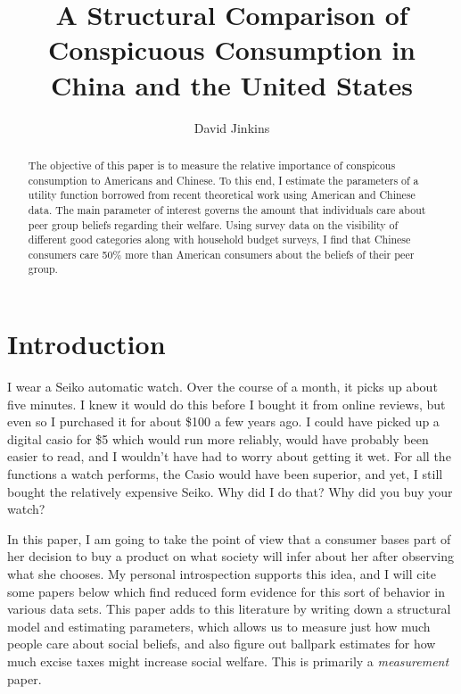\documentclass{article}
\title{A Structural Comparison of Conspicuous Consumption in China and the United States
}
\author{David Jinkins}
\begin{document}
\maketitle

\begin{abstract}
    The objective of this paper is to measure the relative importance of conspicous consumption to Americans and Chinese.  To this end, I estimate the parameters of a utility function borrowed from recent theoretical work using American and Chinese data.  The main parameter of interest governs the amount that individuals care about peer group beliefs regarding their welfare.  Using survey data on the visibility of different good categories along with household budget surveys, I find that Chinese consumers care 50\% more than American consumers about the beliefs of their peer group.  
\end{abstract}

\section{Introduction}

I wear a Seiko automatic watch.  Over the course of a month, it picks up about five minutes.  I knew it would do this before I bought it from online reviews, but even so I purchased it for about \$100 a few years ago.  I could have picked up a digital casio for \$5 which would run more reliably, would have probably been easier to read, and I wouldn't have had to worry about getting it wet.  For all the functions a watch performs, the Casio would have been superior, and yet, I still bought the relatively expensive Seiko.  Why did I do that?  Why did you buy your watch?

In this paper, I am going to take the point of view that a consumer bases part of her decision to buy a product on what society will infer about her after observing what she chooses.  
My personal introspection supports this idea, and I will cite some papers below which find reduced form evidence for this sort of behavior in various data sets. This paper adds to this literature by writing down a structural model and estimating parameters, which allows us to measure just how much people care about social beliefs, and also figure out ballpark estimates for how much excise taxes might increase social welfare. This is primarily a \emph{measurement} paper.
\end{document}
